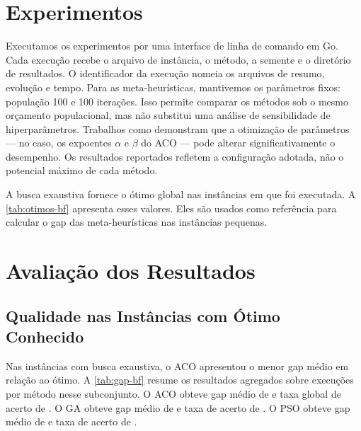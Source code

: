 \begin{table}[htbp]
  \centering
  \caption{Cobertura experimental dos métodos avaliados.}
  \label{tab:cobertura-experimental}
  
\end{table}

\section{Experimentos}

Executamos os experimentos por uma interface de linha de comando em Go. Cada execução recebe o arquivo de instância, o método, a semente e o diretório de resultados. O identificador da execução nomeia os arquivos de resumo, evolução e tempo. Para as meta-heurísticas, mantivemos os parâmetros fixos: população 100 e 100 iterações. Isso permite comparar os métodos sob o mesmo orçamento populacional, mas não substitui uma análise de sensibilidade de hiperparâmetros. Trabalhos como  demonstram que a otimização de parâmetros --- no caso, os expoentes $\alpha$ e $\beta$ do ACO --- pode alterar significativamente o desempenho. Os resultados reportados refletem a configuração adotada, não o potencial máximo de cada método.

A busca exaustiva fornece o ótimo global nas instâncias em que foi executada. A \autoref{tab:otimos-bf} apresenta esses valores. Eles são usados como referência para calcular o gap das meta-heurísticas nas instâncias pequenas.

\begin{table}[htbp]
  \centering
  \caption{Ótimos obtidos por busca exaustiva nas 18 instâncias pequenas.}
  \label{tab:otimos-bf}
  \scriptsize
  
\end{table}

\section{Avaliação dos Resultados}
\label{avaliacao}

\subsection{Qualidade nas Instâncias com Ótimo Conhecido}

Nas \TotalInstanciasComOtimo{} instâncias com busca exaustiva, o \ac{ACO} apresentou o menor gap médio em relação ao ótimo. A \autoref{tab:gap-bf} resume os resultados agregados sobre \TotalExecucoesOtimoPorMetodo{} execuções por método nesse subconjunto. O \ac{ACO} obteve gap médio de \GapMedioOtimoACO{} e taxa global de acerto de \TaxaAcertoOtimoACO{}. O \ac{GA} obteve gap médio de \GapMedioOtimoGA{} e taxa de acerto de \TaxaAcertoOtimoGA{}. O \ac{PSO} obteve gap médio de \GapMedioOtimoPSO{} e taxa de acerto de \TaxaAcertoOtimoPSO{}.

